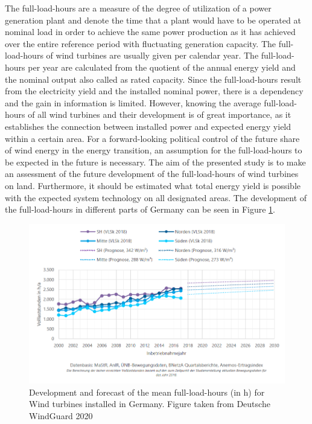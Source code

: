 \documentclass[a4paper,11pt]{article}
\begin{document}
The full-load-hours are a measure of the degree of utilization of a power generation plant and denote the time that a plant would have to be operated at nominal load in order to achieve the same power production as it has achieved over the entire reference period with fluctuating generation capacity. The full-load-hours of wind turbines are usually given per calendar year. The full-load-hours per year are calculated from the quotient of the annual energy yield and the nominal output also called as rated capacity. Since the full-load-hours result from the electricity yield and the installed nominal power, there is a dependency and the gain in information is limited. However, knowing the average full-load-hours of all wind turbines and their development is of great importance, as it establishes the connection between installed power and expected energy yield within a certain area. For a forward-looking political control of the future share of wind energy in the energy transition, an assumption for the full-load-hours to be expected in the future is necessary. The aim of the presented study is to make an assessment of the future development of the full-load-hours of wind turbines on land. Furthermore, it should be estimated what total energy yield is possible with the expected system technology on all designated areas. The development of the full-load-hours in different parts of Germany can be seen in Figure \ref{fig:flh}.
\begin{figure}

{\centering \includegraphics[width=1\linewidth]{figures/DWG/DWG_Volllaststunden} 

}

\caption{Development and forecast of the mean full-load-hours (in h) for Wind turbines installed in Germany. Figure taken from Deutsche WindGuard 2020}\label{fig:flh}
\end{figure}
\end{document}
